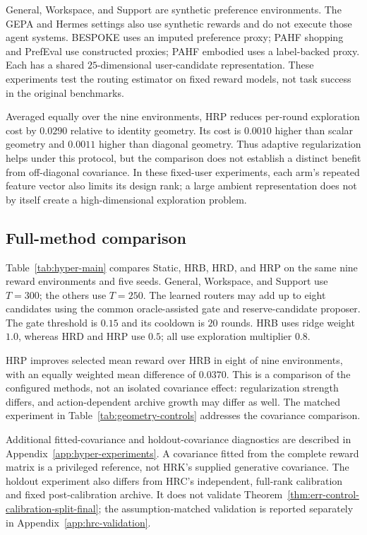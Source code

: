 \documentclass{article} %
\begin{document}
General, Workspace, and Support are synthetic preference environments.
The GEPA and Hermes settings also use synthetic rewards and do not execute
those agent systems. BESPOKE uses an imputed preference proxy; PAHF shopping
and PrefEval use constructed proxies; PAHF embodied uses a label-backed
proxy. Each has a shared $25$-dimensional user-candidate representation.
These experiments test the routing estimator on fixed reward models, not
task success in the original benchmarks.



Averaged equally over the nine environments, HRP reduces per-round
exploration cost by $0.0290$ relative to identity geometry. Its cost is
$0.0010$ higher than scalar geometry and $0.0011$ higher than diagonal
geometry. Thus adaptive regularization helps under this protocol, but the
comparison does not establish a distinct benefit from off-diagonal
covariance. In these fixed-user experiments, each arm's repeated feature
vector also limits its design rank; a large ambient representation does
not by itself create a high-dimensional exploration problem.

\FloatBarrier
\subsection{Full-method comparison}
\label{sec:exp-baselines}

Table~\ref{tab:hyper-main} compares Static, HRB, HRD, and HRP on the same
nine reward environments and five seeds. General, Workspace, and Support
use $T=300$; the others use $T=250$. The learned routers may add up to eight
candidates using the common oracle-assisted gate and reserve-candidate
proposer. The gate threshold is $0.15$ and its cooldown is $20$ rounds.
HRB uses ridge weight $1.0$, whereas HRD and HRP use $0.5$; all use
exploration multiplier $0.8$.



HRP improves selected mean reward over HRB in eight of nine environments,
with an equally weighted mean difference of $0.0370$. This is a comparison
of the configured methods, not an isolated covariance effect: regularization
strength differs, and action-dependent archive growth may differ as well.
The matched experiment in Table~\ref{tab:geometry-controls} addresses the
covariance comparison.

Additional fitted-covariance and holdout-covariance diagnostics are described
in Appendix~\ref{app:hyper-experiments}. A covariance fitted from the complete
reward matrix is a privileged reference, not HRK's supplied generative
covariance. The holdout experiment also differs from HRC's independent,
full-rank calibration and fixed post-calibration archive. It does not
validate Theorem~\ref{thm:err-control-calibration-split-final}; the
assumption-matched validation is reported separately in
Appendix~\ref{app:hrc-validation}.
\end{document}
